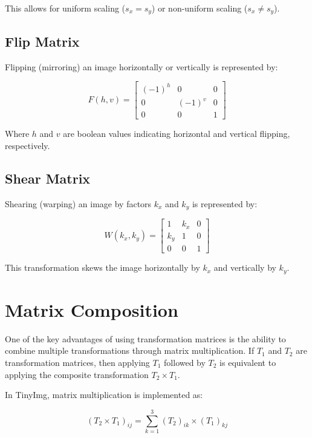 \documentclass{article}
\begin{document}
This allows for uniform scaling ($s_x = s_y$) or non-uniform scaling ($s_x \neq s_y$).

\subsection{Flip Matrix}

Flipping (mirroring) an image horizontally or vertically is represented by:

\begin{equation}
F(h, v) = \begin{bmatrix}
(-1)^h & 0 & 0 \\
0 & (-1)^v & 0 \\
0 & 0 & 1
\end{bmatrix}
\end{equation}

Where $h$ and $v$ are boolean values indicating horizontal and vertical flipping, respectively.

\subsection{Shear Matrix}

Shearing (warping) an image by factors $k_x$ and $k_y$ is represented by:

\begin{equation}
W(k_x, k_y) = \begin{bmatrix}
1 & k_x & 0 \\
k_y & 1 & 0 \\
0 & 0 & 1
\end{bmatrix}
\end{equation}

This transformation skews the image horizontally by $k_x$ and vertically by $k_y$.

\section{Matrix Composition}

One of the key advantages of using transformation matrices is the ability to combine multiple transformations through matrix multiplication. If $T_1$ and $T_2$ are transformation matrices, then applying $T_1$ followed by $T_2$ is equivalent to applying the composite transformation $T_2 \times T_1$.

In TinyImg, matrix multiplication is implemented as:

\begin{equation}
(T_2 \times T_1)_{ij} = \sum_{k=1}^{3} (T_2)_{ik} \times (T_1)_{kj}
\end{equation}
\end{document}
